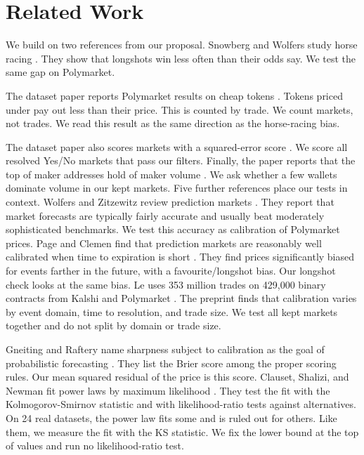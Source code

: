 \section{Related Work}\label{sec:related}
We build on two references from our proposal.
Snowberg and Wolfers study horse racing \citep{snowberg2010favorite}.
They show that longshots win less often than their odds say.
We test the same gap on Polymarket.

The dataset paper reports Polymarket results on cheap tokens \citep[Table~3]{qin2026polymarketv1}.
Tokens priced under \PaperCheapPrice{} pay out \PaperCheapGap{} less than their price.
This is counted by trade.
We count markets, not trades.
We read this result as the same direction as the horse-racing bias.

The dataset paper also scores \PaperBrierMarkets{} markets with a squared-error score \citep{qin2026polymarketv1}.
We score all resolved Yes/No markets that pass our filters.
Finally, the paper reports that the top \TopOneLabel{} of maker addresses hold \PaperTopShare{}
of maker volume \citep[Table~5]{qin2026polymarketv1}.
We ask whether a few wallets dominate volume in our kept markets.
Five further references place our tests in context.
Wolfers and Zitzewitz review prediction markets \citep{wolfers2004prediction}.
They report that market forecasts are typically fairly accurate and usually beat moderately sophisticated benchmarks.
We test this accuracy as calibration of Polymarket prices.
Page and Clemen find that prediction markets are reasonably well calibrated when time to expiration is short \citep{page2013prediction}.
They find prices significantly biased for events farther in the future, with a favourite/longshot bias.
Our longshot check looks at the same bias.
Le uses 353 million trades on 429{,}000 binary contracts from Kalshi and Polymarket \citep{le2026decomposing}.
The preprint finds that calibration varies by event domain, time to resolution, and trade size.
We test all kept markets together and do not split by domain or trade size.

Gneiting and Raftery name sharpness subject to calibration as the goal of probabilistic forecasting \citep{gneiting2007strictly}.
They list the Brier score among the proper scoring rules.
Our mean squared residual of the price is this score.
Clauset, Shalizi, and Newman fit power laws by maximum likelihood \citep{clauset2009power}.
They test the fit with the Kolmogorov-Smirnov statistic and with likelihood-ratio tests against alternatives.
On 24 real datasets, the power law fits some and is ruled out for others.
Like them, we measure the fit with the KS statistic.
We fix the lower bound at the top \TopTenLabel{} of values and run no likelihood-ratio test.
